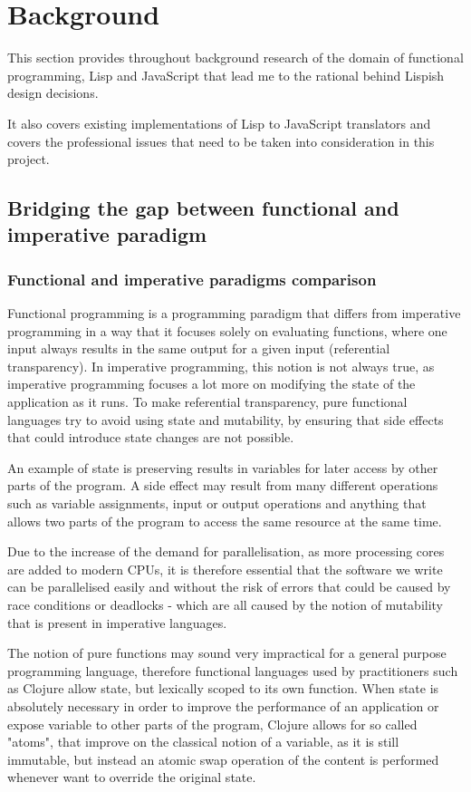 \chapter{Background}
This section provides throughout background research of the domain of functional programming, Lisp and JavaScript that lead me to the rational behind Lispish design decisions. 

It also covers existing implementations of Lisp to JavaScript translators and covers the professional issues that need to be taken into consideration in this project. 

\section{Bridging the gap between functional and imperative paradigm}

\subsection{Functional and imperative paradigms comparison}
Functional programming is a programming paradigm that differs from imperative programming in a way that it focuses solely on evaluating functions, where one input always results in the same output for a given input (referential transparency). In imperative programming, this notion is not always true, as imperative programming focuses a lot more on modifying the state of the application as it runs. To make referential transparency, pure functional languages try to avoid using state and mutability, by ensuring that side effects that could introduce state changes are not possible.

An example of state is preserving results in variables for later access by other parts of the program. A side effect may result from many different operations such as variable assignments, input or output operations and anything that allows two parts of the program to access the same resource at the same time.

Due to the increase of the demand for parallelisation, as more processing cores are added to modern CPUs, it is therefore essential that the software we write can be parallelised easily and without the risk of errors that could be caused by race conditions or deadlocks - which are all caused by the notion of mutability that is present in imperative languages.

The notion of pure functions may sound very impractical for a general purpose programming language, therefore functional languages used by practitioners such as Clojure allow state, but lexically scoped to its own function.
When state is absolutely necessary in order to improve the performance of an application or expose variable to other parts of the program, Clojure allows for so called "atoms", that improve on the classical notion of a variable, as it is still immutable, but instead an atomic swap operation of the content is performed whenever want to override the original state.

